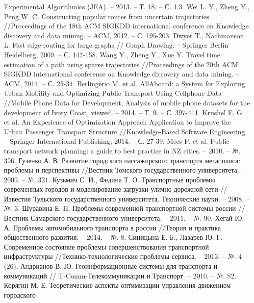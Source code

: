 \begin{thebibliography}{10}
        Experimental Algorithmics (JEA). -- 2013. -- Т. 18. -- С. 1.3.
     Wei L. Y., Zheng Y., Peng W. C. Constructing popular routes from 
        uncertain trajectories //Proceedings of the 18th ACM SIGKDD international conference on 
        Knowledge discovery and data mining. -- ACM, 2012. -- С. 195-203.
     Dwyer T., Nachmanson L. Fast edge-routing for large graphs //
        Graph Drawing. -- Springer Berlin Heidelberg, 2009. -- С. 147-158.
     Wang Y., Zheng Y., Xue Y. Travel time estimation of a path using sparse 
        trajectories //Proceedings of the 20th ACM SIGKDD international conference on Knowledge 
        discovery and data mining. -- ACM, 2014. -- С. 25-34.
     Berlingerio M. et al. AllAboard: a System for Exploring Urban Mobility and 
        Optimizing Public Transport Using Cellphone Data //Mobile Phone Data for Development, Analysis 
        of mobile phone datasets for the development of Ivory Coast, 
        viewed. -- 2014. -- Т. 9. -- С. 397-411.
     Krushel E. G. et al. An Experience of Optimization Approach Application to Improve 
        the Urban Passenger Transport Structure //Knowledge-Based Software Engineering. -- Springer 
        International Publishing, 2014. -- С. 27-39.
     Mees P. et al. Public transport network planning: a guide to best practice in NZ 
        cities. -- 2010. -- №. 396.
     Гузенко А. В. Развитие городского пассажирского транспорта мегаполиса: проблемы 
        и перспективы //Вестник Томского государственного университета. -- 2009. -- №. 321.
     Кузьмич С. И., Федина Т. О. Транспортные проблемы современных городов и 
        моделирование загрузки улично-дорожной сети //Известия Тульского государственного 
        университета. Технические науки. -- 2008. -- №. 3.
     Шуравина Е. Н. Проблемы современной транспортной системы россии //
        Вестник Самарского государственного университета. -- 2011. -- №. 90.
     Хегай Ю. А. Проблемы автомобильного транспорта в россии //Теория и практика 
        общественного развития. -- 2014. -- №. 8.
     Синицына Е. Б., Лазарев Ю. Г. Современное состояние проблемы совершенствования 
        транспортной инфраструктуры //Технико-технологические проблемы сервиса. -- 2013. -- №. 4 (26).
     Андрианов В. Ю. Геоинформационные системы для транспорта и коммуникаций //
        T-Comm-Телекоммуникации и Транспорт. -- 2010. -- №. S2.
     Корягин М. Е. Теоретические аспекты оптимизации управления движением городского 

\end{thebibliography}
